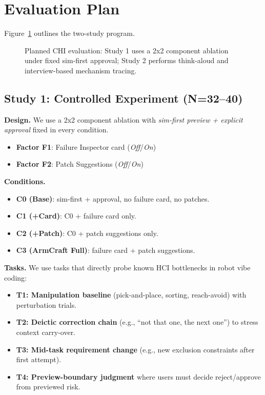 \documentclass[sigconf,review,anonymous]{acmart}
\begin{document}
\section{Evaluation Plan}
Figure~\ref{fig:study-design} outlines the two-study program.

\begin{figure}[t]
  \centering
  \resizebox{\columnwidth}{!}{}
  \caption{Planned CHI evaluation: Study 1 uses a 2x2 component ablation under fixed sim-first approval; Study 2 performs think-aloud and interview-based mechanism tracing.}
  \label{fig:study-design}
\end{figure}

\subsection{Study 1: Controlled Experiment (N=32--40)}
\textbf{Design.}
We use a 2x2 component ablation with \emph{sim-first preview + explicit approval} fixed in every condition.
\begin{itemize}
  \item \textbf{Factor F1}: Failure Inspector card (\textit{Off}/\textit{On})
  \item \textbf{Factor F2}: Patch Suggestions (\textit{Off}/\textit{On})
\end{itemize}

\textbf{Conditions.}
\begin{itemize}
  \item \textbf{C0 (Base)}: sim-first + approval, no failure card, no patches.
  \item \textbf{C1 (+Card)}: C0 + failure card only.
  \item \textbf{C2 (+Patch)}: C0 + patch suggestions only.
  \item \textbf{C3 (ArmCraft Full)}: failure card + patch suggestions.
\end{itemize}

\textbf{Tasks.}
We use tasks that directly probe known HCI bottlenecks in robot vibe coding:
\begin{itemize}
  \item \textbf{T1: Manipulation baseline} (pick-and-place, sorting, reach-avoid) with perturbation trials.
  \item \textbf{T2: Deictic correction chain} (e.g., ``not that one, the next one'') to stress context carry-over.
  \item \textbf{T3: Mid-task requirement change} (e.g., new exclusion constraints after first attempt).
  \item \textbf{T4: Preview-boundary judgment} where users must decide reject/approve from previewed risk.
\end{itemize}
\end{document}
